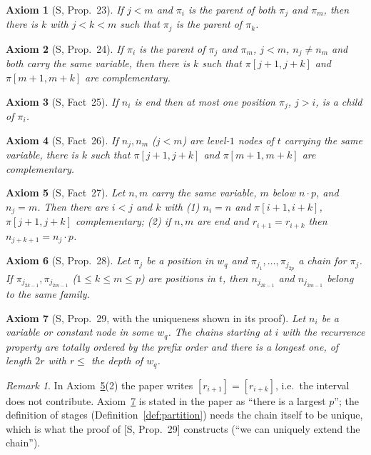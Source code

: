 \documentclass[11pt]{article}
\newcommand{\suc}[2]{#1{\cdot}#2}
\newcommand{\iv}[2]{\pi[#1,#2]}
\theoremstyle{plain}
\newtheorem{axU}{Axiom}
\theoremstyle{definition}
\theoremstyle{remark}
\newtheorem{remark}[theorem]{Remark}
\begin{document}
\begin{axU}[S, Prop.~23]\label{U:between}
If $j<m$ and $\pi_i$ is the parent of both $\pi_j$ and $\pi_m$, then
there is $k$ with $j<k<m$ such that $\pi_j$ is the parent of $\pi_k$.
\end{axU}

\begin{axU}[S, Prop.~24]\label{U:compl}
If $\pi_i$ is the parent of $\pi_j$ and $\pi_m$, $j<m$, $n_j\ne n_m$ and
both carry the same variable, then there is $k$ such that
$\iv{j+1}{j+k}$ and $\iv{m+1}{m+k}$ are complementary.
\end{axU}

\begin{axU}[S, Fact~25]\label{U:end-child}
If $n_i$ is end then at most one position $\pi_j$, $j>i$, is a child of
$\pi_i$.
\end{axU}

\begin{axU}[S, Fact~26]\label{U:level1}
If $n_j,n_m$ ($j<m$) are level-$1$ nodes of $t$ carrying the same
variable, there is $k$ such that $\iv{j+1}{j+k}$ and $\iv{m+1}{m+k}$ are
complementary.
\end{axU}

\begin{axU}[S, Fact~27]\label{U:embedded}
Let $n,m$ carry the same variable, $m$ below $\suc np$, and $n_j=m$.
Then there are $i<j$ and $k$ with (1) $n_i=n$ and $\iv{i+1}{i+k}$,
$\iv{j+1}{j+k}$ complementary; (2) if $n,m$ are end and
$r_{i+1}=r_{i+k}$ then $n_{j+k+1}=\suc{n_j}p$.
\end{axU}

\begin{axU}[S, Prop.~28]\label{U:family}
Let $\pi_j$ be a position in $w_q$ and $\pi_{j_1},\dots,\pi_{j_{2p}}$ a
chain for $\pi_j$.  If $\pi_{j_{2k-1}},\pi_{j_{2m-1}}$ ($1\le k\le m\le p$)
are positions in $t$, then $n_{j_{2k-1}}$ and $n_{j_{2m-1}}$ belong to the
same family.
\end{axU}

\begin{axU}[S, Prop.~29, with the uniqueness shown in its proof]\label{U:maxchain}
Let $n_i$ be a variable or constant node in some $w_q$.  The chains
starting at $i$ with the recurrence property are totally ordered by
the prefix order and there is a longest one, of length $2r$ with
$r\le$ the depth of $w_q$.
\end{axU}

\begin{remark}
In Axiom~\ref{U:embedded}(2) the paper writes $[r_{i+1}]=[r_{i+k}]$,
i.e.\ the interval does not contribute.
Axiom~\ref{U:maxchain} is stated in the paper as ``there is a largest
$p$''; the definition of stages (Definition~\ref{def:partition}) needs
the chain itself to be unique, which is what the proof of [S, Prop.~29]
constructs (``we can uniquely extend the chain'').
\end{remark}
\end{document}
